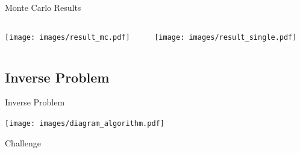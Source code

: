 \documentclass[compress,red,12pt]{beamer}
\begin{document}
\begin{frame}{Monte Carlo Results}
  \begin{columns}[T]
    \begin{column}{.5\textwidth}
      \centering
      {
        \texttt{[image: images/result\_mc.pdf]}
      }
      {
        \centerline{\def\svgwidth{0.8\linewidth}\footnotesize{}}
      }
    \end{column}
    \begin{column}{.5\textwidth}
      \centering
      {
        \texttt{[image: images/result\_single.pdf]}
      }
      {
        \centerline{\def\svgwidth{0.8\linewidth}\footnotesize{}}
      }
    \end{column}
  \end{columns}
\end{frame}


\subsection{Inverse Problem}

\begin{frame}{Inverse Problem}
  \begin{center}
    \texttt{[image: images/diagram\_algorithm.pdf]}
  \end{center}
\end{frame}


\begin{frame}{Challenge}
  \begin{center}
    \centering
  \end{center}
\end{frame}

\end{document}
